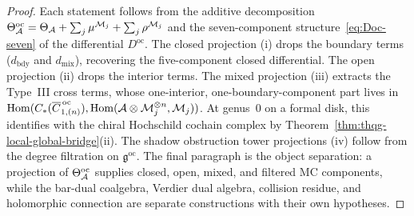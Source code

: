 \begin{proof}
Each statement follows from the additive decomposition
$\Theta^{\mathrm{oc}}_{\mathcal{A}}
= \Theta_{\mathcal{A}} + \sum_j \mu^{\mathcal{M}_j}
 + \sum_j \rho^{\mathcal{M}_j}$
and the seven-component structure~\eqref{eq:Doc-seven} of the
differential $D^{\mathrm{oc}}$. The closed projection (i) drops
the boundary terms ($d_{\mathrm{bdy}}$ and $d_{\mathrm{mix}}$),
recovering the five-component closed differential. The open
projection (ii) drops the interior terms. The mixed projection (iii)
extracts the Type~III cross terms, whose one-interior,
one-boundary-component part lives in
$\operatorname{Hom}(C_*(\overline{C}^{\,\mathrm{oc}}_{1, (n)}),
\operatorname{Hom}(\mathcal{A} \otimes \mathcal{M}_j^{\otimes n},
\mathcal{M}_j))$.
At genus~$0$ on a formal disk, this identifies with the chiral
Hochschild cochain complex by
Theorem~\ref{thm:thqg-local-global-bridge}(ii).
The shadow obstruction tower projections (iv) follow from the degree
filtration on $\mathfrak{g}^{\mathrm{oc}}$. The final paragraph is
the object separation: a projection of
$\Theta^{\mathrm{oc}}_{\mathcal{A}}$ supplies closed, open, mixed, and filtered
MC components, while the bar-dual coalgebra, Verdier dual algebra,
collision residue, and holomorphic connection are separate
constructions with their own hypotheses.
\end{proof}

